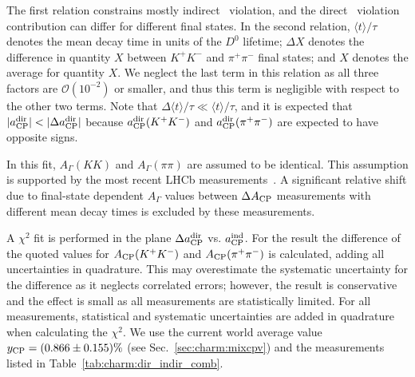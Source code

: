 The first relation constrains mostly indirect \cp\ violation, and the 
direct \cp\ violation contribution can differ for different final states. 
In the second relation, $\langle t\rangle/\tau$ denotes the mean decay 
time in units of the $D^0$ lifetime; $\Delta X$ denotes the difference 
in quantity $X$ between $K^+K^-$ and $\pi^+\pi^-$ final states; and $X$ 
denotes the average for quantity $X$. 
We neglect the last term in this relation as all three factors are 
$\mathcal{O}(10^{-2})$ or smaller, and thus this term is negligible 
with respect to the other two terms. 
Note that $\Delta\langle t\rangle/\tau \ll\langle t\rangle/\tau$, and 
it is expected that $|a_{\rm CP}^{\rm dir}| < |\Delta a_{\rm CP}^{\rm dir}|$ 
because $a_{\rm CP}^{\rm dir}(K^+K^-)$ and $a_{\rm CP}^{\rm dir}(\pi^+\pi^-)$ 
are expected to have opposite signs. 

In this fit, $A_\Gamma(KK)$ and $A_\Gamma(\pi\pi)$ are assumed to be identical.
This assumption is supported by the most recent LHCb measurements~\cite{Aaij:2013ria}.
A significant relative shift due to final-state dependent $A_\Gamma$ values between $\Delta A_{\rm CP}$ measurements with different mean decay times is excluded by these measurements.

A $\chi^2$ fit is performed in the plane $\Delta a_{\rm CP}^{\rm dir}$ 
vs. $a_{\rm CP}^{\rm ind}$. 
For the \babar result the difference of the quoted values for 
$A_{\rm CP}(K^+K^-)$ and $A_{\rm CP}(\pi^+\pi^-)$ is calculated, 
adding all uncertainties in quadrature. 
This may overestimate the systematic uncertainty for the difference 
as it neglects correlated errors; however, the result is conservative 
and the effect is small as all measurements are statistically limited. 
For all measurements, statistical and systematic uncertainties are added 
in quadrature when calculating the $\chi^2$. 
We use the current world average value $y_{\rm CP} = (0.866 \pm 0.155)\%$ 
(see Sec.~\ref{sec:charm:mixcpv}) and the measurements listed in 
Table~\ref{tab:charm:dir_indir_comb}. 

